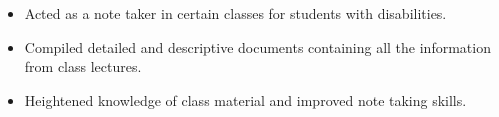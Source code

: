 \documentclass[10pt,a4paper,ragged2e,withhyper]{altacv}
\begin{document}
\begin{paracol}{2}
\medskip


\begin{itemize}
  \item Acted as a note taker in certain classes for students with disabilities.
  \item Compiled detailed and descriptive documents containing all the information from class lectures.
  \item Heightened knowledge of class material and improved note taking skills.
\end{itemize}

\end{paracol}
\end{document}
